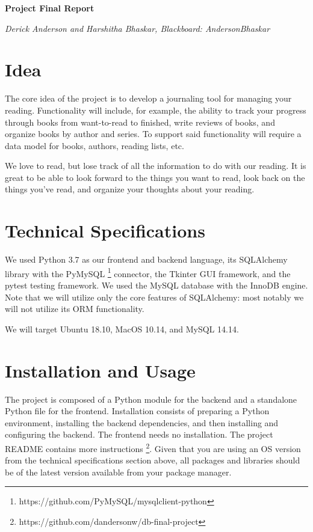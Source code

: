 \documentclass{article}
\begin{document}

\begin{center}
  \textbf{Project Final Report}

  \textit{Derick Anderson and Harshitha Bhaskar, Blackboard: AndersonBhaskar}
\end{center}

\section*{Idea}

The core idea of the project is to develop a journaling tool for managing your
reading. Functionality will include, for example, the ability to track your
progress through books from want-to-read to finished, write reviews of books,
and organize books by author and series. To support said functionality will
require a data model for books, authors, reading lists, etc.

We love to read, but lose track of all the information to do with our
reading. It is great to be able to look forward to the things you want to read,
look back on the things you’ve read, and organize your thoughts about your
reading.

\section*{Technical Specifications}

We used Python 3.7 as our frontend and backend language,
its SQLAlchemy library with the
PyMySQL \footnote{https://github.com/PyMySQL/mysqlclient-python}
connector,
the Tkinter GUI framework,
and the pytest testing framework.
We used the MySQL database with the InnoDB engine.
Note that we will utilize only the core features of SQLAlchemy:
most notably we will not utilize its ORM functionality.

We will target Ubuntu 18.10, MacOS 10.14, and MySQL 14.14.

\section*{Installation and Usage}

The project is composed of a Python module for the backend
and a standalone Python file for the frontend.
Installation consists of preparing a Python environment,
installing the backend dependencies,
and then installing and configuring the backend.
The frontend needs no installation.
The project README contains more instructions
\footnote{https://github.com/dandersonw/db-final-project}.
Given that you are using an OS version from the
technical specifications section above,
all packages and libraries should be of the latest version available
from your package manager.
\end{document}
